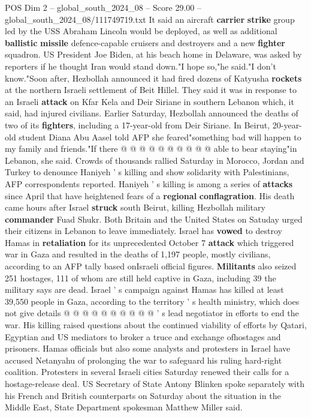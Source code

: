 \begin{textsample}{POS Dim 2 – global\_south\_2024\_08 – Score 29.00 – global\_south\_2024\_08/111749719.txt}
It said an aircraft \textbf{carrier} \textbf{strike} group led by the USS Abraham Lincoln would be deployed, as well as additional \textbf{ballistic} \textbf{missile} defence-capable cruisers and destroyers and a new \textbf{fighter} squadron.
US President Joe Biden, at his beach home in Delaware, was asked by reporters if he thought Iran would stand down."I hope so,"he said."I don't know."Soon after, Hezbollah announced it had fired dozens of Katyusha \textbf{rockets} at the northern Israeli settlement of Beit Hillel.
They said it was in response to an Israeli \textbf{attack} on Kfar Kela and Deir Siriane in southern Lebanon which, it said, had injured civilians.
Earlier Saturday, Hezbollah announced the deaths of two of its \textbf{fighters}, including a 17-year-old from Deir Siriane.
In Beirut, 20-year-old student Diana Abu Aasel told AFP she feared"something bad will happen to my family and friends."If there @ @ @ @ @ @ @ @ @ @ able to bear staying"in Lebanon, she said.
Crowds of thousands rallied Saturday in Morocco, Jordan and Turkey to denounce Haniyeh ' s killing and show solidarity with Palestinians, AFP correspondents reported.
Haniyeh ' s killing is among a series of \textbf{attacks} since April that have heightened fears of a \textbf{regional} \textbf{conflagration}.
His death came hours after Israel \textbf{struck} south Beirut, killing Hezbollah military \textbf{commander} Fuad Shukr.
Both Britain and the United States on Satuday urged their citizens in Lebanon to leave immediately.
Israel has \textbf{vowed} to destroy Hamas in \textbf{retaliation} for its unprecedented October 7 \textbf{attack} which triggered war in Gaza and resulted in the deaths of 1,197 people, mostly civilians, according to an AFP tally based onIsraeli official figures. \textbf{Militants} also seized 251 hostages, 111 of whom are still held captive in Gaza, including 39 the military says are dead.
Israel ' s campaign against Hamas has killed at least 39,550 people in Gaza, according to the territory ' s health ministry, which does not give details @ @ @ @ @ @ @ @ @ @ ' s lead negotiator in efforts to end the war.
His killing raised questions about the continued viability of efforts by Qatari, Egyptian and US mediators to broker a truce and exchange ofhostages and prisoners.
Hamas officials but also some analysts and protesters in Israel have accused Netanyahu of prolonging the war to safeguard his ruling hard-right coalition.
Protesters in several Israeli cities Saturday renewed their calls for a hostage-release deal.
US Secretary of State Antony Blinken spoke separately with his French and British counterparts on Saturday about the situation in the Middle East, State Department spokesman Matthew Miller said.

\end{textsample}
